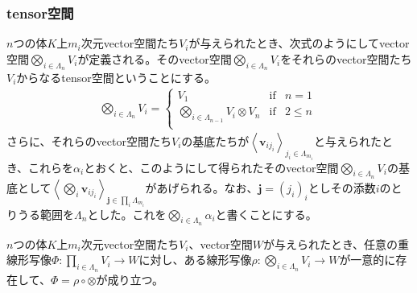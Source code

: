 \documentclass[dvipdfmx]{jsarticle}
\begin{document}
\subsubsection{tensor空間}%
\begin{dfn}
$n$つの体$K$上$m_{i}$次元vector空間たち$V_{i}$が与えられたとき、次式のようにしてvector空間$\bigotimes_{i \in \varLambda_{n}} V_{i}$が定義される。そのvector空間$\bigotimes_{i \in \varLambda_{n}} V_{i}$をそれらのvector空間たち$V_{i}$からなるtensor空間ということにする。
\begin{align*}
\bigotimes_{i \in \varLambda_{n}} V_{i} = \left\{ \begin{matrix}
V_{1} & \mathrm{if} & n = 1 \\
\bigotimes_{i \in \varLambda_{n - 1}} V_{i} \otimes V_{n} & \mathrm{if} & 2 \leq n \\
\end{matrix} \right.\ 
\end{align*}
さらに、それらのvector空間たち$V_{i}$の基底たちが$\left\langle \mathbf{v}_{ij_{i}} \right\rangle_{j_{i} \in \varLambda_{m_{i}}}$と与えられたとき、これらを$\alpha_{i}$とおくと、このようにして得られたそのvector空間$\bigotimes_{i \in \varLambda_{n}} V_{i}$の基底として$\left\langle \bigotimes_{i} \mathbf{v}_{ij_{i}} \right\rangle_{\mathbf{j}\in \prod_{i} \varLambda_{m_{i}}}$があげられる。なお、$\mathbf{j}=\left( j_{i} \right)_{i} $としその添数$i$のとりうる範囲を$\varLambda_{n}$とした。これを$\bigotimes_{i \in \varLambda_{n}} \alpha_{i}$と書くことにする。
\end{dfn}
\begin{thm}\label{2.4.6.3}
$n$つの体$K$上$m_{i}$次元vector空間たち$V_{i}$、vector空間$W$が与えられたとき、任意の重線形写像$\varPhi:\prod_{i \in \varLambda_{n}} V_{i} \rightarrow W$に対し、ある線形写像$\rho:\bigotimes_{i \in \varLambda_{n}} V_{i} \rightarrow W$が一意的に存在して、$\varPhi = \rho \circ \otimes$が成り立つ。
\end{thm}
\end{document}
